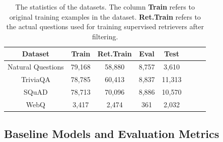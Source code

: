 \documentclass[sigconf,natbib=true,anonymous=false]{acmart}
\begin{document}
\begin{table}[t!]
\centering
\begin{tabular}{c|ccccccc}
\toprule
Dataset           & Train & Ret.Train & Eval & Test &\\
\hline
Natural Questions & 79,168 & 58,880 & 8,757 & 3,610 \\
TriviaQA          & 78,785 & 60,413 & 8,837 & 11,313\\
SQuAD             & 78,713 & 70,096 & 8,886 & 10,570\\
WebQ              & 3,417  & 2,474  & 361   & 2,032 \\
\bottomrule
\end{tabular}
\caption{The statistics of the datasets. The column \textbf{Train} refers to original training examples in the dataset. \textbf{Ret.Train} refers to the actual questions used for training supervised retrievers after filtering.}
\label{tab: data}
\end{table}

\subsection{Baseline Models and Evaluation Metrics}
\end{document}
